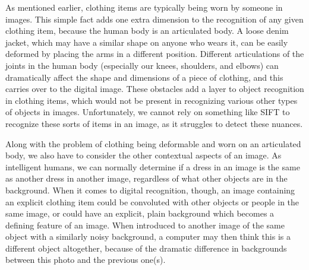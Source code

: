 \documentclass[12pt]{report} %
\begin{document}
	As mentioned earlier, clothing items are typically being worn by someone in images. This simple fact adds one extra dimension to the recognition of any given clothing item, because the human body is an articulated body. A loose denim jacket, which may have a similar shape on anyone who wears it, can be easily deformed by placing the arms in a different position. Different articulations of the joints in the human body (especially our knees, shoulders, and elbows) can dramatically affect the shape and dimensions of a piece of clothing, and this carries over to the digital image. These obstacles add a layer to object recognition in clothing items, which would not be present in recognizing various other types of objects in images. Unfortunately, we cannot rely on something like SIFT\cite{lowe1999object} to recognize these sorts of items in an image, as it struggles to detect these nuances. 


	Along with the problem of clothing being deformable and worn on an articulated body, we also have to consider the other contextual aspects of an image. As intelligent humans, we can normally determine if a dress in an image is the same as another dress in another image, regardless of what other objects are in the background. When it comes to digital recognition, though, an image containing an explicit clothing item could be convoluted with other objects or people in the same image, or could have an explicit, plain background which becomes a defining feature of an image. When introduced to another image of the same object with a similarly noisy background, a computer may then think this is a different object altogether, because of the dramatic difference in backgrounds between this photo and the previous one(s). 
	
	
\end{document}

